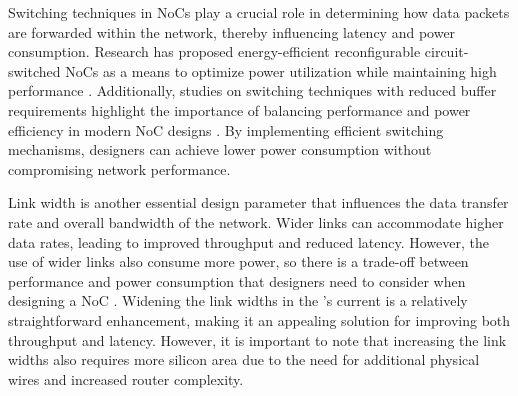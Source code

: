

Switching techniques in NoCs play a crucial role in determining how data packets are forwarded within the network, thereby influencing latency and power consumption.
Research has proposed energy-efficient reconfigurable circuit-switched NoCs as a means to optimize power utilization while maintaining high performance \cite{wolkotteEnergyEfficientReconfigurableCircuitSwitched2005}.
Additionally, studies on switching techniques with reduced buffer requirements highlight the importance of balancing performance and power efficiency in modern NoC designs \cite{requenaEfficientSwitchingTechnique2008}.
By implementing efficient switching mechanisms, designers can achieve lower power consumption without compromising network performance.

Link width is another essential design parameter that influences the data transfer rate and overall bandwidth of the network.
Wider links can accommodate higher data rates, leading to improved throughput and reduced latency.
However, the use of wider links also consume more power, so there is a trade-off between performance and power consumption that designers need to consider when designing a NoC \cite{manhokimNetworkonchipLinkAnalysis2006}.
Widening the link widths in the \graicore{}'s current \confignoc{} is a relatively straightforward enhancement, making it an appealing solution for improving both throughput and latency.
However, it is important to note that increasing the link widths also requires more silicon area due to the need for additional physical wires and increased router complexity.

